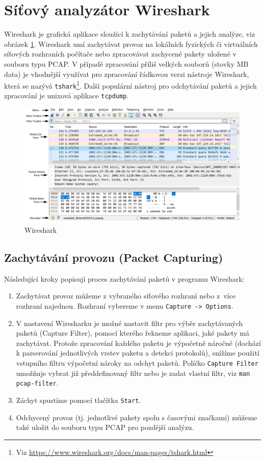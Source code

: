 \section{Síťový analyzátor Wireshark}\label{wireshark}
Wireshark je grafická aplikace sloužící k zachytávání paketů a jejich analýze, viz obrázek \ref{fig:wireshark-layout}. Wireshark umí zachytávat provoz na lokálních fyzických či virtuálních síťových rozhraních počítače nebo zpracovávat zachycené pakety uložené v souboru typu PCAP. V případě zpracování příliš velkých souborů (stovky MB data) je vhodnější využívat pro zpracování řádkovou verzi nástroje Wireshark, která se nazývá {\tt tshark}\footnote{Viz \url{https://www.wireshark.org/docs/man-pages/tshark.html}}. Další populární nástroj pro odchytávání paketů a jejich zpracování je unixová aplikace \texttt{tcpdump}. 

\begin{figure}[h]
  \centering
  \includegraphics[width=170mm]{fig/wireshark-layout.pdf}
  \caption{Wireshark}\label{fig:wireshark-layout}
\end{figure}

\subsection{Zachytávání provozu (Packet Capturing)}
Následující kroky popisují proces zachytávání paketů v programu Wireshark:
\begin{enumerate}
  \item Zachytávat provoz můžeme z vybraného síťového rozhraní nebo z~více rozhraní najednou. Rozhraní vybereme v menu \texttt{Capture -> Options}.
  \item V nastavení Wiresharku je možné nastavit filtr pro výběr zachytávaných paketů (Capture Filter), pomocí kterého řekneme aplikaci, jaké pakety má zachytávat. Protože zpracování každého paketu je výpočetně náročné (dochází k parserování jednotlivých vrstev paketu a detekci protokolů), snížíme použití vstupního filtru výpočetní nároky na odchyt paketů. Políčko {\tt Capture Filter} umožňuje vybrat již předdefinovaný filtr nebo je zadat vlastní filtr, viz {\tt man pcap-filter}.
  \item Záchyt spustíme pomocí tlačítka \texttt{Start}.
  \item Odchycený provoz (tj. jednotlivé pakety spolu s časovými značkami) můžeme také uložit do souboru typu PCAP pro pozdější analýzu.
\end{enumerate}

